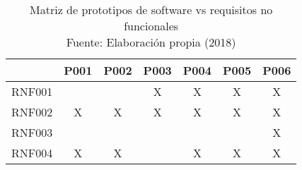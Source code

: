\begin{table}[H]
\centering
\captionsetup{justification=centering}
\caption[Matriz de prototipos de software vs requisitos no funcionales]{Matriz de prototipos de software vs requisitos no funcionales \\ Fuente: Elaboración propia (2018)}
\label{table:RNF-summary}
\begin{tabular}{|c|c|c|c|c|c|c|}
\hline
 & P001 & P002 & P003 & P004 & P005 & P006 \\ \hline
RNF001 &  &  & X & X & X & X \\ \hline
RNF002 & X & X & X & X & X & X \\ \hline
RNF003 &  &  &  &  &  & X \\ \hline
RNF004 & X & X &  & X & X & X \\ \hline
\end{tabular}
\end{table}